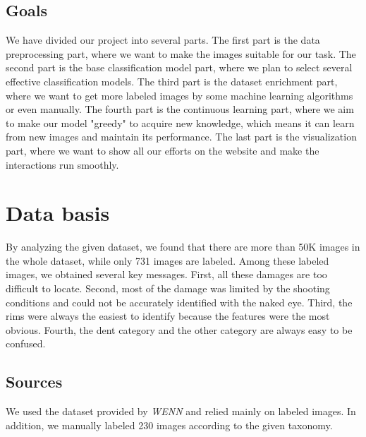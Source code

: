 \documentclass[lang=english,inputenc=utf8,fontsize=10pt]{ldvarticle}
\begin{document}
\subsection{Goals}
We have divided our project into several parts. The first part is the data preprocessing part, where we want to make the images suitable for our task. The second part is the base classification model part, where we plan to select several effective classification models. The third part is the dataset enrichment part, where we want to get more labeled images by some machine learning algorithms or even manually. The fourth part is the continuous learning part, where we aim to make our model "greedy" to acquire new knowledge, which means it can learn from new images and maintain its performance. The last part is the visualization part, where we want to show all our efforts on the website and make the interactions run smoothly.


\newpage

\section{Data basis}
By analyzing the given dataset, we found that there are more than 50K images in the whole dataset, while only 731 images are labeled. Among these labeled images, we obtained several key messages. First, all these damages are too difficult to locate. Second, most of the damage was limited by the shooting conditions and could not be accurately identified with the naked eye. Third, the rims were always the easiest to identify because the features were the most obvious. Fourth, the dent category and the other category are always easy to be confused.


\subsection{Sources}
We used the dataset provided by \textit{WENN} and relied mainly on labeled images. In addition, we manually labeled 230 images according to the given taxonomy.
\end{document}
